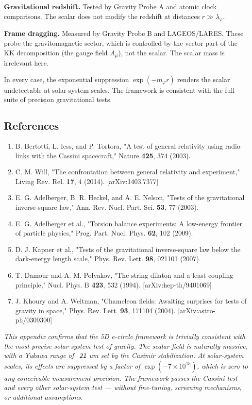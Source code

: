 \documentclass[aps,prd,preprint,superscriptaddress,longbibliography,floatfix]{revtex4-2}
\theoremstyle{remark}
\begin{document}
\textbf{Gravitational redshift.} Tested by Gravity Probe A and atomic clock comparisons. The scalar does not modify the redshift at distances $r \gg \lambda_\varphi$.

\textbf{Frame dragging.} Measured by Gravity Probe B and LAGEOS/LARES. These probe the gravitomagnetic sector, which is controlled by the vector part of the KK decomposition (the gauge field $A_\mu$), not the scalar. The scalar mass is irrelevant here.

In every case, the exponential suppression $\exp(-m_\varphi r)$ renders the scalar undetectable at solar-system scales. The framework is consistent with the full suite of precision gravitational tests.



\subsection{References}


\begin{enumerate}
  \item B. Bertotti, L. Iess, and P. Tortora, "A test of general relativity using radio links with the Cassini spacecraft," Nature \textbf{425}, 374 (2003).
  \item C. M. Will, "The confrontation between general relativity and experiment," Living Rev. Rel. \textbf{17}, 4 (2014). [arXiv:1403.7377]
  \item E. G. Adelberger, B. R. Heckel, and A. E. Nelson, "Tests of the gravitational inverse-square law," Ann. Rev. Nucl. Part. Sci. \textbf{53}, 77 (2003).
  \item E. G. Adelberger et al., "Torsion balance experiments: A low-energy frontier of particle physics," Prog. Part. Nucl. Phys. \textbf{62}, 102 (2009).
  \item D. J. Kapner et al., "Tests of the gravitational inverse-square law below the dark-energy length scale," Phys. Rev. Lett. \textbf{98}, 021101 (2007).
  \item T. Damour and A. M. Polyakov, "The string dilaton and a least coupling principle," Nucl. Phys. B \textbf{423}, 532 (1994). [arXiv:hep-th/9401069]
  \item J. Khoury and A. Weltman, "Chameleon fields: Awaiting surprises for tests of gravity in space," Phys. Rev. Lett. \textbf{93}, 171104 (2004). [arXiv:astro-ph/0309300]
\end{enumerate}


\textit{This appendix confirms that the 5D e-circle framework is trivially consistent with the most precise solar-system test of gravity. The scalar field is naturally massive, with a Yukawa range of \texttt{~21} um set by the Casimir stabilization. At solar-system scales, its effects are suppressed by a factor of $\exp(-7 \times 10^{15})$, which is zero to any conceivable measurement precision. The framework passes the Cassini test --- and every other solar-system test --- without fine-tuning, screening mechanisms, or additional assumptions.}
\end{document}
